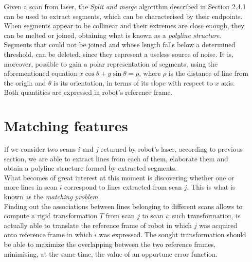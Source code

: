 \documentclass[a4paper, onecolumn]{report}
\begin{document}
Given a scan from laser, the \emph{Split and merge} algorithm described in Section 2.4.1 can be used to extract segments, which can be characterised by their endpoints. When segments appear to be collinear and their extremes are close enough, they can be melted or joined, obtaining what is known as a \emph{polyline structure}. Segments that could not be joined and whose length falls below a determined threshold, can be deleted, since they represent a useless source of noise. It is, moreover, possible to gain a polar representation of segments, using the aforementioned equation $x\cos \theta + y\sin\theta = \rho$, where $\rho$ is the distance of line from the origin and $\theta$ is its orientation, in terms of its slope with respect to $x$ axis. Both quantities are expressed in robot's reference frame.

\section{Matching features}
If we consider two scans $i$ and $j$ returned by robot's laser, according to previous section, we are able to extract lines from each of them, elaborate them and obtain a polyline structure formed by extracted segments. \\
What becomes of great interest at this moment is discovering whether one or more lines in scan $i$ correspond to lines extracted from scan $j$. This is what is known as the \emph{matching problem}. \\
Finding out the associations between lines belonging to different scans allows to compute a rigid transformation $T$ from scan $j$ to scan $i$; such transformation, is actually able to translate the reference frame of robot in which $j$ was acquired onto reference frame in which $i$ was expressed. The sought transformation should be able to maximize the overlapping between the two reference frames, minimising, at the same time, the value of an opportune error function.
\end{document}
